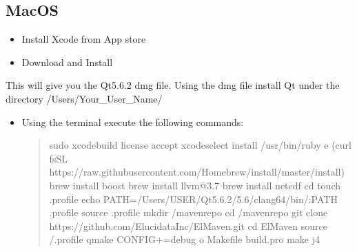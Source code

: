 \documentclass[letterpaper,10pt,english,openany,oneside]{sphinxmanual}
\begin{document}
\subsection{MacOS}
\label{\detokenize{Build:macos}}\begin{itemize}
\item {} 
Install Xcode from App store

\item {} 
Download and Install 

\end{itemize}

This will give you the Qt5.6.2 dmg file. Using the dmg file install Qt under the directory /Users/Your\_User\_Name/
\begin{itemize}
\item {} 
Using the terminal execute the following commands:
\begin{quote}

%
\begin{sphinxVerbatim}[commandchars=\\\{\}]
\PYGZdl{} sudo xcodebuild \PYGZhy{}license accept
\PYGZdl{} xcode\PYGZhy{}select \PYGZhy{}\PYGZhy{}install
\PYGZdl{} /usr/bin/ruby \PYGZhy{}e \PYGZdq{}\PYGZdl{}(curl \PYGZhy{}fsSL https://raw.githubusercontent.com/Homebrew/install/master/install)\PYGZdq{}
\PYGZdl{} brew install boost
\PYGZdl{} brew install llvm@3.7
\PYGZdl{} brew install netcdf
\PYGZdl{} cd \PYGZti{}
\PYGZdl{} touch .profile
\PYGZdl{} echo \PYGZdq{}PATH=/Users/\PYGZdl{}USER/Qt5.6.2/5.6/clang\PYGZus{}64/bin/:\PYGZdl{}PATH\PYGZdq{} \PYGZgt{} .profile
\PYGZdl{} source .profile
\PYGZdl{} mkdir \PYGZti{}/maven\PYGZus{}repo
\PYGZdl{} cd \PYGZti{}/maven\PYGZus{}repo
\PYGZdl{} git clone https://github.com/ElucidataInc/ElMaven.git
\PYGZdl{} cd ElMaven
\PYGZdl{} source \PYGZti{}/.profile
\PYGZdl{} qmake CONFIG+=debug \PYGZhy{}o Makefile build.pro
\PYGZdl{} make \PYGZhy{}j4
\end{sphinxVerbatim}
\end{quote}

\end{itemize}
\end{document}
